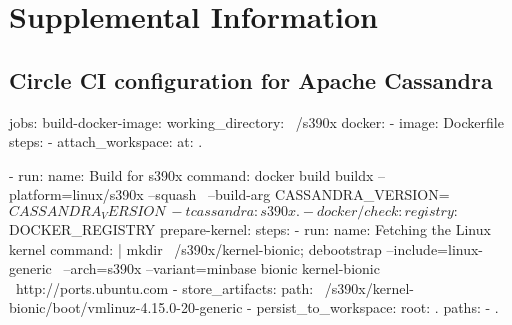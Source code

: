 \chapter{Supplemental Information}\label{app:supplemental-information}

\section{Circle CI configuration for Apache Cassandra}\label{CircleCI}
\begin{boxedverbatim}
jobs:
  build-docker-image:
    working_directory: ~/s390x
    docker:
      - image: Dockerfile
    steps:
      - attach_workspace:
          at: .
      
      - run: 
            name: Build for s390x
            command: docker build buildx --platform=linux/s390x --squash \
                     --build-arg CASSANDRA_VERSION=$CASSANDRA_VERSION \
                     -t cassandra:s390x .
      - docker/check:
         registry: $DOCKER_REGISTRY 
  prepare-kernel:
    steps:
        - run:
              name: Fetching the Linux kernel
              command: |
                      mkdir ~/s390x/kernel-bionic; debootstrap --include=linux-generic \
                      --arch=s390x --variant=minbase bionic kernel-bionic \
                      http://ports.ubuntu.com
        - store_artifacts:
              path: ~/s390x/kernel-bionic/boot/vmlinuz-4.15.0-20-generic
        - persist_to_workspace:
                  root: .
                  paths:
                      - .
        
\end{boxedverbatim}

